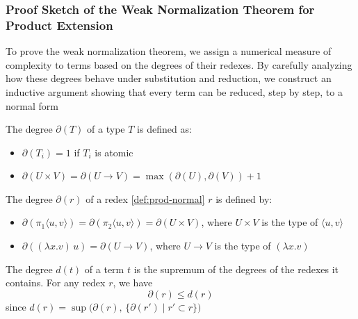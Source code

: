 \subsubsection{\centering Proof Sketch of the Weak Normalization Theorem for Product Extension}
\label{proof:weak-normalization}
To prove the weak normalization theorem, we assign a numerical measure of complexity to terms based on the degrees of their redexes. By carefully analyzing how these degrees behave under substitution and reduction, we construct an inductive argument showing that every term can be reduced, step by step, to a normal form
\begin{definition}
The degree $\partial(T)$ of a type $T$ is defined as:
\begin{itemize}
\item $\partial(T_i) = 1$ if $T_i$ is atomic
\item $\partial(U \times V) = \partial(U \to V) = \max(\partial(U), \partial(V)) + 1$
\end{itemize}
\end{definition}
\begin{definition}
The degree $\partial(r)$ of a redex \ref{def:prod-normal} $r$ is defined by:
\begin{itemize}
    \item $\partial(\pi_1\langle u, v \rangle) = \partial(\pi_2\langle u, v \rangle) = \partial(U \times V)$, where $U \times V$ is the type of $\langle u, v \rangle$
    \item $\partial((\lambda x. v)\, u) = \partial(U \to V)$, where $U \to V$ is the type of $(\lambda x. v)$
\end{itemize}
\end{definition}
\begin{definition}
\label{def:term-degree}
The degree $d(t)$ of a term $t$ is the supremum of the degrees of the redexes it contains. For any redex $r$, we have
\[
\partial(r) \le d(r)
\]
since \( d(r) = \sup\bigl(\partial(r),\, \{\partial(r') \mid r' \subset r\}\bigr) \)
\end{definition}

